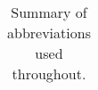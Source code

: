 \begin{table}[!h]
\begin{tabular}{|c|p{7.5cm}|}
\hline
\end{tabular}
\caption{Summary of abbreviations used throughout.}
\label{table:Abbreviations}
\end{table}







